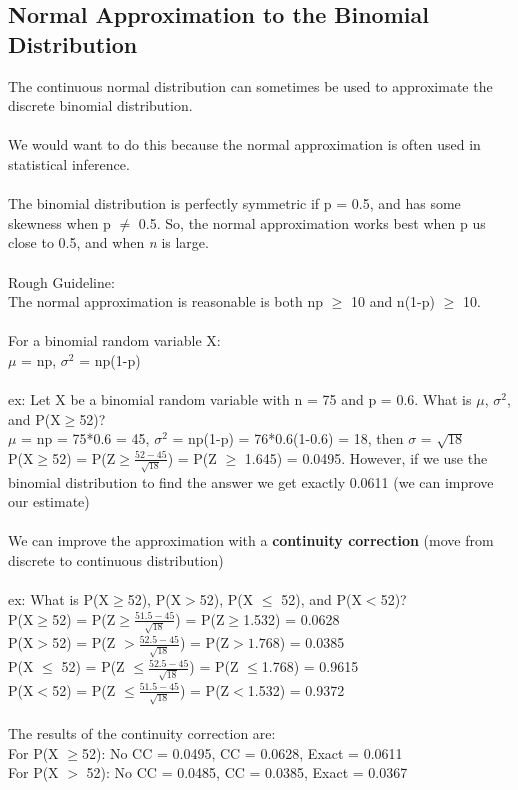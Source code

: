 \documentclass[12pt, a4paper]{article}
\begin{document}
	\subsection{Normal Approximation to the Binomial Distribution}
	The continuous normal distribution can sometimes be used to approximate the discrete binomial distribution. \\~\\
	We would want to do this because the normal approximation is often used in statistical inference. \\~\\
	The binomial distribution is perfectly symmetric if p = 0.5, and has some skewness when p $\neq$ 0.5. So, the normal approximation works best when p us close to 0.5, and when \textit{n} is large. \\~\\
	Rough Guideline: \\
	The normal approximation is reasonable is both np $\geq$ 10 and n(1-p) $\geq$ 10. \\~\\
	For a binomial random variable X: \\
	$\mu$ = np, $\sigma^2$ = np(1-p) \\~\\
	ex: Let X be a binomial random variable with n = 75 and p = 0.6. What is $\mu$, $\sigma^2$, and P(X$\geq$52)? \\
	$\mu$ = np = 75*0.6 = 45, $\sigma^2$ = np(1-p) = 76*0.6(1-0.6) = 18, then $\sigma$ = $\sqrt{18}$ \\ P(X$\geq$52) = P(Z$\geq\frac{52-45}{\sqrt{18}}$) = P(Z $\geq$ 1.645) = 0.0495. However, if we use the binomial distribution to find the answer we get exactly 0.0611 (we can improve our estimate) \\~\\
	We can improve the approximation with a \textbf{continuity correction} (move from discrete to continuous distribution) \\~\\
	ex: What is P(X$\geq$52), P(X$>$52), P(X $\leq$ 52), and P(X$<$52)? \\
	P(X$\geq$52) = P(Z$\geq \frac{51.5-45}{\sqrt{18}}$) = P(Z$\geq$1.532) = 0.0628 \\
	P(X$>$52) = P(Z $>\frac{52.5-45}{\sqrt{18}}$) = P(Z$>1.768$) = 0.0385 \\
	P(X $\leq$ 52) = P(Z $\leq\frac{52.5-45}{\sqrt{18}}$) = P(Z $\leq$1.768) = 0.9615 \\
	P(X$<$52) = P(Z $\leq\frac{51.5-45}{\sqrt{18}}$) = P(Z$<$1.532) = 0.9372 \\~\\
	The results of the continuity correction are: \\
	For P(X $\geq$52): No CC = 0.0495, CC = 0.0628, Exact = 0.0611 \\
	For P(X $>$ 52): No CC = 0.0485, CC = 0.0385, Exact = 0.0367 \newpage
	
\end{document}

